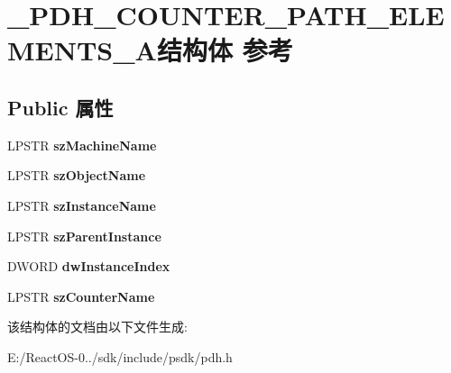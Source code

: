 \hypertarget{struct___p_d_h___c_o_u_n_t_e_r___p_a_t_h___e_l_e_m_e_n_t_s___a}{}\section{\+\_\+\+P\+D\+H\+\_\+\+C\+O\+U\+N\+T\+E\+R\+\_\+\+P\+A\+T\+H\+\_\+\+E\+L\+E\+M\+E\+N\+T\+S\+\_\+\+A结构体 参考}
\label{struct___p_d_h___c_o_u_n_t_e_r___p_a_t_h___e_l_e_m_e_n_t_s___a}
\subsection*{Public 属性}
\begin{DoxyCompactItemize}
\item 
\mbox{\label{struct___p_d_h___c_o_u_n_t_e_r___p_a_t_h___e_l_e_m_e_n_t_s___a_a91a10f9382bb67d58c5eb9f95fba3c81}} 
L\+P\+S\+TR {\bfseries sz\+Machine\+Name}
\item 
\mbox{\label{struct___p_d_h___c_o_u_n_t_e_r___p_a_t_h___e_l_e_m_e_n_t_s___a_ac023486b591581e19daa66a0a0f69064}} 
L\+P\+S\+TR {\bfseries sz\+Object\+Name}
\item 
\mbox{\label{struct___p_d_h___c_o_u_n_t_e_r___p_a_t_h___e_l_e_m_e_n_t_s___a_affbb3d8b84397f9df4ce63bf05e975b4}} 
L\+P\+S\+TR {\bfseries sz\+Instance\+Name}
\item 
\mbox{\label{struct___p_d_h___c_o_u_n_t_e_r___p_a_t_h___e_l_e_m_e_n_t_s___a_adefffa4b678d491685b001174a3c45da}} 
L\+P\+S\+TR {\bfseries sz\+Parent\+Instance}
\item 
\mbox{\label{struct___p_d_h___c_o_u_n_t_e_r___p_a_t_h___e_l_e_m_e_n_t_s___a_a26f19ab2ebdb7c4bf9f6ca5aa395eef6}} 
D\+W\+O\+RD {\bfseries dw\+Instance\+Index}
\item 
\mbox{\label{struct___p_d_h___c_o_u_n_t_e_r___p_a_t_h___e_l_e_m_e_n_t_s___a_af5a100ce2027893f4a047879860718f0}} 
L\+P\+S\+TR {\bfseries sz\+Counter\+Name}
\end{DoxyCompactItemize}


该结构体的文档由以下文件生成\+:\begin{DoxyCompactItemize}
\item 
E\+:/\+React\+O\+S-\/0../sdk/include/psdk/pdh.\+h\end{DoxyCompactItemize}
